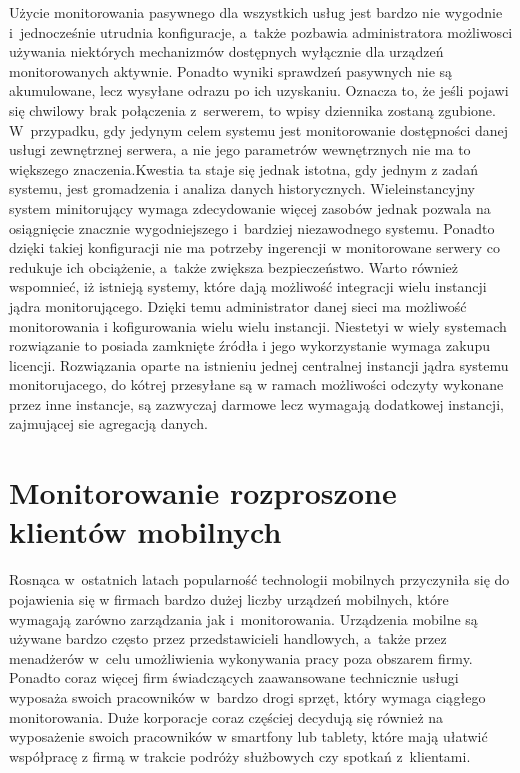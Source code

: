 
Użycie monitorowania pasywnego dla wszystkich usług jest bardzo nie
wygodnie i~jednocześnie utrudnia konfiguracje, a~także pozbawia
administratora możliwosci używania niektórych mechanizmów dostępnych
wyłącznie dla urządzeń monitorowanych aktywnie. Ponadto wyniki
sprawdzeń pasywnych nie są akumulowane, lecz wysyłane odrazu po ich
uzyskaniu. Oznacza to, że jeśli pojawi się chwilowy brak połączenia
z~serwerem, to wpisy dziennika zostaną zgubione. W~przypadku, gdy
jedynym celem systemu jest monitorowanie dostępności danej usługi
zewnętrznej serwera, a nie jego parametrów wewnętrznych nie ma to
większego znaczenia.Kwestia ta staje się jednak istotna, gdy jednym z
zadań systemu, jest gromadzenia i analiza danych
historycznych. Wieleinstancyjny system minitorujący wymaga
zdecydowanie więcej zasobów jednak pozwala na osiągnięcie znacznie
wygodniejszego i~bardziej niezawodnego systemu. Ponadto dzięki takiej
konfiguracji nie ma potrzeby ingerencji w monitorowane serwery co
redukuje ich obciążenie, a~także zwiększa bezpieczeństwo. Warto
również wspomnieć, iż istnieją systemy, które dają możliwość
integracji wielu instancji jądra monitorującego. Dzięki temu
administrator danej sieci ma możliwość monitorowania i kofigurowania
wielu wielu instancji. Niestetyi w wiely systemach rozwiązanie to
posiada zamknięte źródła i jego wykorzystanie wymaga zakupu
licencji. Rozwiązania oparte na istnieniu jednej centralnej instancji
jądra systemu monitorujacego, do kótrej przesyłane są w ramach
możliwości odczyty wykonane przez inne instancje, są zazwyczaj darmowe
lecz wymagają dodatkowej instancji, zajmującej sie agregacją danych.

\section[Monitorowanie rozproszone][Monitorowanie rozproszone klientów
mobilnych]{Monitorowanie rozproszone klientów mobilnych}


Rosnąca w~ostatnich latach popularność technologii mobilnych
przyczyniła się do pojawienia się w firmach bardzo dużej liczby
urządzeń mobilnych, które wymagają zarówno zarządzania jak
i~monitorowania. Urządzenia mobilne są używane bardzo często przez
przedstawicieli handlowych, a~także przez menadżerów w~celu
umożliwienia wykonywania pracy poza obszarem firmy. Ponadto coraz
więcej firm świadczących zaawansowane technicznie usługi wyposaża
swoich pracowników w~bardzo drogi sprzęt, który wymaga ciągłego
monitorowania. Duże korporacje coraz częściej decydują się również na
wyposażenie swoich pracowników w smartfony lub tablety, które mają
ułatwić współpracę z firmą w trakcie podróży służbowych czy spotkań
z~klientami.

